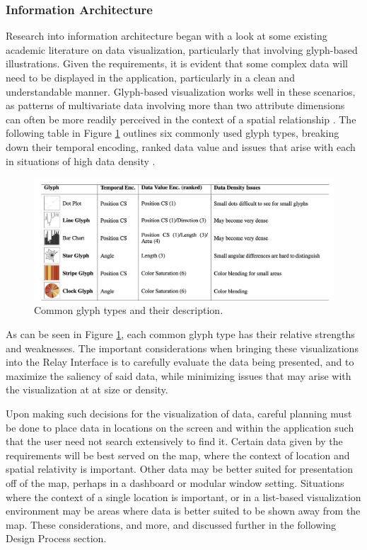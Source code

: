 \documentclass{report}
\begin{document}
\subsubsection{Information Architecture}
Research into information architecture began with a look at some existing academic literature on data visualization, particularly that involving glyph-based illustrations.
Given the requirements, it is evident that some complex data will need to be displayed in the application, particularly in a clean and understandable manner.
Glyph-based visualization works well in these scenarios, as patterns of multivariate data involving more than two attribute dimensions can often be more readily perceived in the context of a spatial relationship \cite{borgo2012glyph}.
The following table in Figure \ref{fig:glyphs} outlines six commonly used glyph types, breaking down their temporal encoding, ranked data value and issues that arise with each in situations of high data density \cite{fuchs2013evaluation}.

\begin{figure}[htbp!]
  \begin{centering}
    \includegraphics[scale=0.27]{figures/glyph_table.png}
    \caption{Common glyph types and their description.}
    \label{fig:glyphs}
  \end{centering}
\end{figure}

As can be seen in Figure \ref{fig:glyphs}, each common glyph type has their relative strengths and weaknesses.
The important considerations when bringing these visualizations into the Relay Interface is to carefully evaluate the data being presented, and to maximize the saliency of said data, while minimizing issues that may arise with the visualization at at size or density.

Upon making such decisions for the visualization of data, careful planning must be done to place data in locations on the screen and within the application such that the user need not search extensively to find it.
Certain data given by the requirements will be best served on the map, where the context of location and spatial relativity is important.
Other data may be better suited for presentation off of the map, perhaps in a dashboard or modular window setting.
Situations where the context of a single location is important, or in a list-based visualization environment may be areas where data is better suited to be shown away from the map.
These considerations, and more, and discussed further in the following Design Process section.
\end{document}
